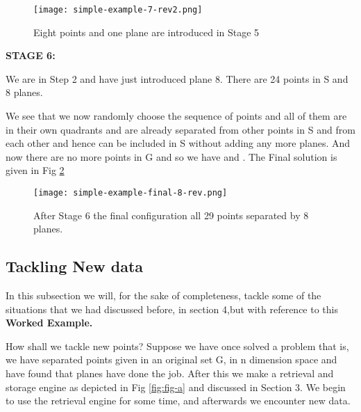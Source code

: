 \documentclass[english]{article}
\begin{document}
\medskip{}

\begin{figure}[htp]
 \begin{center}
\texttt{[image: simple-example-7-rev2.png]}

\caption{Eight points and one plane are introduced in Stage 5}

\label{fig:fig-g} \end{center}
\end{figure} 


\medskip{}


\textbf{STAGE 6:}

We are in Step 2 and have just introduced plane 8. There are 24 points
in S and 8 planes.

We see that we now randomly choose the sequence of points 
and  all of them are in their own quadrants and are already
separated from other points in S and from each other and hence can be
included in S without adding any more planes. And now there are no
more points in G and so we have and . The Final solution
is given in Fig \ref{fig:fig-h}

\medskip{}
\begin{figure}[htp]
 \begin{center}
\texttt{[image: simple-example-final-8-rev.png]}

\caption{After Stage 6 the final configuration all 29 points separated by 8 planes.}

\label{fig:fig-h} \end{center}
\end{figure} 

\newpage
\subsection{Tackling New data}

In this subsection we will, for the sake of completeness, tackle some of the situations that we had
discussed before, in section 4,but with reference
 to this \textbf{Worked  Example.}


How shall we tackle new points?  Suppose we have once solved a problem that is, we have separated  points given in an original set G, in n dimension space and have found that  planes have done the job. After this we make a retrieval and storage engine as depicted in Fig \ref{fig:fig-a}  and discussed in Section 3. We begin to use the retrieval engine for some time, and afterwards we encounter new data. 
\end{document}
